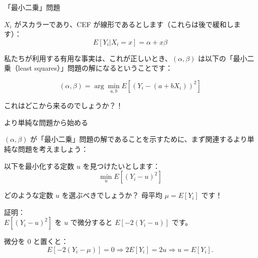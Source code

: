 \documentclass[11pt,handout]{beamer}
\newenvironment{wideitemize}{\itemize\addtolength{\itemsep}{10pt}}{\enditemize}
\begin{document}
\begin{frame}{「最小二乗」問題}

\begin{wideitemize}

\item
$X_i$ がスカラーであり、CEF が線形であるとします（これらは後で緩和します）：
$$E[Y_i | X_i = x] = \alpha + x \beta$$

\pause
\item
私たちが利用する有用な事実は、これが正しいとき、$(\alpha,\beta)$ は以下の「最小二乗（least squares）」問題の解になるということです：

$$(\alpha,\beta)=\arg\min_{a,b} E[ (Y_i - (a + b X_i))^2  ] $$


\pause
\item
これはどこから来るのでしょうか？！


\end{wideitemize}
	
\end{frame}

\begin{frame}{より単純な問題から始める}
\begin{wideitemize}
	\item
	$(\alpha,\beta)$ が「最小二乗」問題の解であることを示すために、まず関連するより単純な問題を考えましょう：
	
	\pause
	\item
	以下を最小化する定数 $u$ を見つけたいとします：
	$$\min_u E[ (Y_i - u)^2 ]$$
	
	\pause
	\item
	どのような定数 $u$ を選ぶべきでしょうか？ \pause 母平均 $\mu=E[Y_i]$ です！
	
	\pause
	\item
	証明： \\
	
	$E[ (Y_i - u)^2 ]$ を $u$ で微分すると $E[ -2(Y_i - u) ]$ です。 \\ \pause
	
	
	微分を 0 と置くと：
	$$E[ -2(Y_i - \mu) ] = 0 \Rightarrow 2 E[Y_i] = 2 u \Rightarrow u = E[Y_i].$$
	
\end{wideitemize}	
\end{frame}
\end{document}
